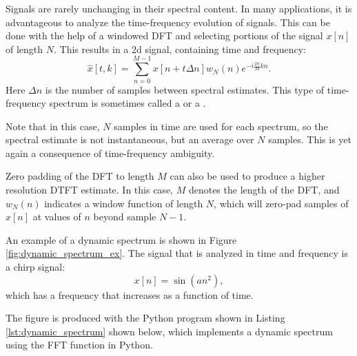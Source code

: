 Signals are rarely unchanging in their spectral content. In many
applications, it is advantageous to analyze the time-frequency
evolution of signals. This can be done with the help of a windowed DFT
and selecting portions of the signal $x[n]$ of length $N$. This
results in a 2d signal, containing time and frequency:
\begin{equation}
\hat{x}[t,k] = \sum_{n=0}^{M-1} x[n+t\Delta n] w_N(n) e^{-i\frac{2\pi}{M}kn}.
\end{equation}
Here $\Delta n$ is the number of samples between spectral
estimates. This type of time-frequency spectrum is sometimes called
a \emph{} or
a \emph{}. 

Note that in this case, $N$ samples in time are used for each
spectrum, so the spectral estimate is not instantaneous, but an
average over $N$ samples. This is yet again a consequence of
time-frequency ambiguity.

Zero padding of the DFT to length $M$ can also be used to produce a
higher resolution DTFT estimate. In this case, $M$ denotes the length
of the DFT, and $w_N(n)$ indicates a window function of length $N$,
which will zero-pad samples of $x[n]$ at values of $n$ beyond sample
$N-1$.

An example of a dynamic spectrum is shown in
Figure \ref{fig:dynamic_spectrum_ex}. The signal that is analyzed in
time and frequency is a chirp signal:
\begin{equation}
x[n]=\sin(a n^2),
\end{equation}
which has a frequency that increases as a function of time.

The figure is produced with the Python program shown in
Listing \ref{lst:dynamic_spectrum} shown below, which implements
a dynamic spectrum using the FFT function in Python.

